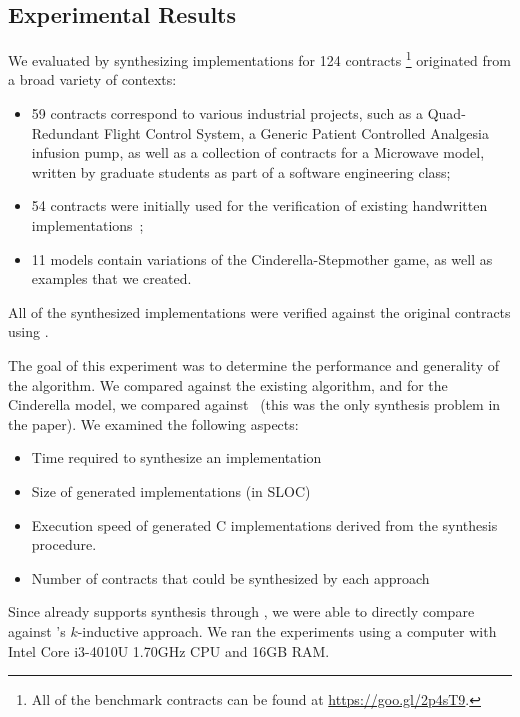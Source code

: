 \subsection{Experimental Results}
\label{sec:results}

We evaluated \jsynvg by synthesizing implementations
for 124 contracts%
\footnote{All of the benchmark contracts can be found at
\url{https://goo.gl/2p4sT9}.}
originated from a broad variety of contexts:
\begin{itemize}
\item 59 contracts correspond to various industrial projects, such as a Quad-Redundant Flight Control System, a Generic Patient Controlled Analgesia infusion pump, as well as a collection of contracts
for a Microwave model, written by graduate students as part of a software
engineering class;
\item 54 contracts were initially used for the verification of existing handwritten implementations~\cite{hagen2008scaling};
\item 11 models contain variations of the
Cinderella-Stepmother game, as well as examples that we created.
\end{itemize}
All of the synthesized implementations were verified against the original contracts using \jkind.

The goal of this experiment was to determine the performance and generality of the \jsynvg algorithm.  We compared against the existing \jsyn algorithm, and for the Cinderella model, we compared against~\cite{beyene2014constraint} (this was the only synthesis problem in the paper).  We examined the following aspects:
\begin{itemize}
    \item Time required to synthesize an implementation
    \item Size of generated implementations (in SLOC)
    \item Execution speed of generated C implementations derived from the synthesis procedure.
    \item Number of contracts that could be synthesized by each approach
\end{itemize}
\noindent Since \jkind already supports synthesis through \jsyn, we were able to directly
compare \jsynvg against \jsyn's $k$-inductive approach. We
ran the experiments using a computer with Intel Core i3-4010U 1.70GHz CPU and
16GB RAM.

